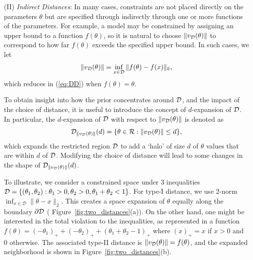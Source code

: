 \documentclass[10pt,fleqn]{article}
\DeclareMathOperator{\1}{\mathbbm{1}} \DeclareMathOperator{\bigO}{\mc O}
\begin{document}
(II) {\em Indirect Distances}: In many cases, constraints are not placed directly on the parameters $\theta$ but are specified through indirectly through one or more functions of the parameters.  For example, a model may be constrained by assigning an upper bound to a function $f(\theta)$, so it is natural to choose $\|v_{\mathcal{D}}(\theta)\|$ to correspond to how far $f(\theta)$ exceeds the specified upper bound.  In such cases, we let 
\begin{eqnarray}
\|v_{\mathcal{D}}(\theta)\| = \inf_{x\in\mathcal{D}} \|f(\theta)-f(x)\|_k, 
\label{eq:ID}
\end{eqnarray}
which reduces in (\ref{eq:DD}) when $f(\theta)=\theta$.

To obtain insight into how the prior concentrates around $\mathcal{D}$, and the impact of the choice of distance, 
it is useful to introduce the concept of $d$-expansion of $\mathcal{D}$.  In particular, the $d$-expansion of $\mathcal{D}$ with respect to $\|v_{\mathcal{D}}(\theta)\|$ is denoted as 
$${\mathcal{D}}_{\|v_{\mathcal{D}}(\theta)\|}(d) = \{ \theta \in \mathcal{R}: \|v_\mathcal{D}(\theta)\| \le d \},$$
which expands the restricted region $\mathcal{D}$ to add a `halo' of size $d$ of $\theta$ values that are within $d$ of $\mathcal{D}$.  Modifying the choice of distance will lead to some changes in the shape of 
${\mathcal{D}}_{\|v_{\mathcal{D}}(\theta)\|}(d)$.

To illustrate, we consider a  constrained space under $3$ inequalities $\mathcal{D}=\{(\theta_1,\theta_2):  \theta_1 >0, \theta_2>0, \theta_1+\theta_2<1\}$. For type-I distance, we use $2$-norm $\inf_{x\in\mathcal{D}} \|\theta-x\|_{2}$. This creates a space expansion of $\theta$ equally along the boundary $\partial\mathcal{D}$ ( Figure~\ref{fig:two_distances}(a)). On the other hand, one might be interested in the total violation to the inequalities, as represented in a function $f(\theta)= (-\theta_1)_+ + (-\theta_2)_+ + (\theta_1+\theta_2-1)_+$ where $(x)_+ = x$ if $x>0$ and $0$ otherwise. The associated type-II distance is $\|v_{\mathcal{D}}(\theta)\| =f (\theta)$, and the expanded neighborhood is shown in  Figure~\ref{fig:two_distances}(b).
\end{document}
